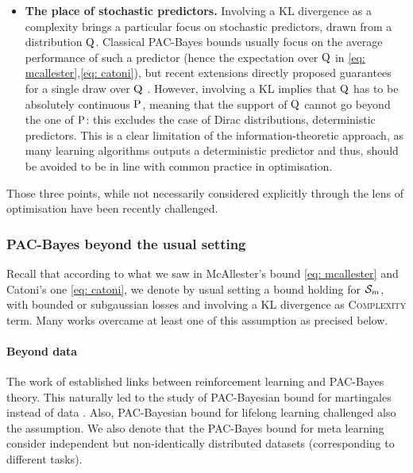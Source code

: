 \begin{itemize}
  \item \textbf{The place of stochastic predictors.} Involving a KL divergence as a complexity brings a particular focus on stochastic predictors, drawn from a distribution $\Q$. Classical PAC-Bayes bounds usually focus on the average performance of such a predictor (hence the expectation over $\Q$ in \eqref{eq: mcallester},\eqref{eq: catoni}), but recent extensions directly proposed guarantees for a single draw over $\Q$ \citep{rivasplata2020pac,viallard2023general}. However, involving a KL implies that $\Q$ has to be absolutely continuous \wrt $\P$,  meaning that the support of $\Q$ cannot go beyond the one of $\P$: this excludes the case of Dirac distributions, \ie deterministic predictors. This is a clear limitation of the information-theoretic approach, as many learning algorithms outputs a deterministic predictor and thus, should be avoided to be in line with common practice in optimisation.
\end{itemize}

Those three points, while not necessarily considered explicitly through the lens of optimisation have been recently challenged.



\subsubsection*{PAC-Bayes beyond the usual setting}

Recall that according to what we saw in McAllester's bound \eqref{eq: mcallester} and Catoni's one \eqref{eq: catoni}, we denote by usual setting a bound holding for \iid $\Sm$, with bounded or subgaussian losses and involving a KL divergence as \textsc{Complexity} term. Many works overcame at least one of this assumption as precised below. 

\paragraph{Beyond \iid data} The work of \citet{fard2010pac} established links between reinforcement learning and PAC-Bayes theory. This naturally led to the study of PAC-Bayesian bound for martingales instead of \iid data \citep{seldin2011pac,seldin2012bandit,seldin2012pac}. Also, PAC-Bayesian bound for lifelong learning \citep{pentina2014pac,flynn2022pac} challenged also the \iid assumption. We also denote that the PAC-Bayes bound for meta learning \citep{amit2018meta,farid2021generalization,rothfuss2021pacoh,ding2021bridging,rothfuss2022pac} consider independent but non-identically distributed datasets (corresponding to different tasks).

